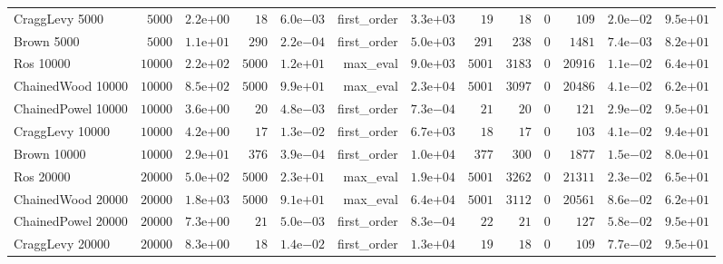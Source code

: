 \begin{longtable}[c]{lrrrrrrrrrrrr}
CraggLevy 5000 & \( 5000\) & \( 2.2\)e\(+00\) & \(   18\) & \( 6.0\)e\(-03\) & first\_order & \( 3.3\)e\(+03\) & \(   19\) & \(   18\) & \(    0\) & \(  109\) & \( 2.0\)e\(-02\) & \( 9.5\)e\(+01\) \\
Brown 5000 & \( 5000\) & \( 1.1\)e\(+01\) & \(  290\) & \( 2.2\)e\(-04\) & first\_order & \( 5.0\)e\(+03\) & \(  291\) & \(  238\) & \(    0\) & \( 1481\) & \( 7.4\)e\(-03\) & \( 8.2\)e\(+01\) \\
Ros 10000 & \(10000\) & \( 2.2\)e\(+02\) & \( 5000\) & \( 1.2\)e\(+01\) & max\_eval & \( 9.0\)e\(+03\) & \( 5001\) & \( 3183\) & \(    0\) & \(20916\) & \( 1.1\)e\(-02\) & \( 6.4\)e\(+01\) \\
ChainedWood 10000 & \(10000\) & \( 8.5\)e\(+02\) & \( 5000\) & \( 9.9\)e\(+01\) & max\_eval & \( 2.3\)e\(+04\) & \( 5001\) & \( 3097\) & \(    0\) & \(20486\) & \( 4.1\)e\(-02\) & \( 6.2\)e\(+01\) \\
ChainedPowel 10000 & \(10000\) & \( 3.6\)e\(+00\) & \(   20\) & \( 4.8\)e\(-03\) & first\_order & \( 7.3\)e\(-04\) & \(   21\) & \(   20\) & \(    0\) & \(  121\) & \( 2.9\)e\(-02\) & \( 9.5\)e\(+01\) \\
CraggLevy 10000 & \(10000\) & \( 4.2\)e\(+00\) & \(   17\) & \( 1.3\)e\(-02\) & first\_order & \( 6.7\)e\(+03\) & \(   18\) & \(   17\) & \(    0\) & \(  103\) & \( 4.1\)e\(-02\) & \( 9.4\)e\(+01\) \\
Brown 10000 & \(10000\) & \( 2.9\)e\(+01\) & \(  376\) & \( 3.9\)e\(-04\) & first\_order & \( 1.0\)e\(+04\) & \(  377\) & \(  300\) & \(    0\) & \( 1877\) & \( 1.5\)e\(-02\) & \( 8.0\)e\(+01\) \\
Ros 20000 & \(20000\) & \( 5.0\)e\(+02\) & \( 5000\) & \( 2.3\)e\(+01\) & max\_eval & \( 1.9\)e\(+04\) & \( 5001\) & \( 3262\) & \(    0\) & \(21311\) & \( 2.3\)e\(-02\) & \( 6.5\)e\(+01\) \\
ChainedWood 20000 & \(20000\) & \( 1.8\)e\(+03\) & \( 5000\) & \( 9.1\)e\(+01\) & max\_eval & \( 6.4\)e\(+04\) & \( 5001\) & \( 3112\) & \(    0\) & \(20561\) & \( 8.6\)e\(-02\) & \( 6.2\)e\(+01\) \\
ChainedPowel 20000 & \(20000\) & \( 7.3\)e\(+00\) & \(   21\) & \( 5.0\)e\(-03\) & first\_order & \( 8.3\)e\(-04\) & \(   22\) & \(   21\) & \(    0\) & \(  127\) & \( 5.8\)e\(-02\) & \( 9.5\)e\(+01\) \\
CraggLevy 20000 & \(20000\) & \( 8.3\)e\(+00\) & \(   18\) & \( 1.4\)e\(-02\) & first\_order & \( 1.3\)e\(+04\) & \(   19\) & \(   18\) & \(    0\) & \(  109\) & \( 7.7\)e\(-02\) & \( 9.5\)e\(+01\) \\

\end{longtable}
